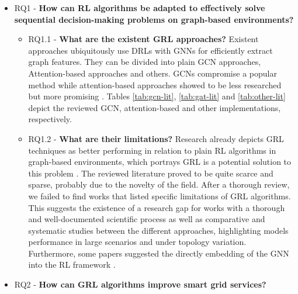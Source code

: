 \begin{itemize}
	\item RQ1 - \textbf{How can \ac{RL} algorithms be adapted to effectively solve sequential decision-making problems on graph-based environments?} 
	\begin{itemize}
		\item RQ1.1 - \textbf{What are the existent \ac{GRL} approaches?}
		 Existent approaches ubiquitously use \acp{DRL} with \acp{GNN} for efficiently extract graph features. They can be divided into plain \ac{GCN} approaches, Attention-based approaches and others. \acp{GCN} compromise a popular method while attention-based approaches showed to be less researched but more promising \cite{xingRealtimeOptimalScheduling2023, zhaoLearningSequentialDistribution2022}. Tables \ref{tab:gcn-lit}, \ref{tab:gat-lit} and \ref{tab:other-lit} depict the reviewed \ac{GCN}, attention-based and other implementations, respectively. \\
		\item RQ1.2 - \textbf{What are their limitations?}
		 Research already depicts \ac{GRL} techniques as better performing in relation to plain \ac{RL} algorithms in graph-based environments, which portrays \ac{GRL} is a potential solution to this problem \cite{chenScalableGraphReinforcement2023, liNovelGraphReinforcement2022, zhaoGraphbasedDeepReinforcement2022, xingBilevelGraphReinforcement2023, xingGraphReinforcementLearningBased2023, xuSimulationConstraintGraphReinforcement2020}. The reviewed literature proved to be quite scarce and sparse, probably due to the novelty of the field. After a thorough review, we failed to find works that listed specific limitations of \ac{GRL} algorithms. This suggests the existence of a research gap for works with a thorough and well-documented scientific process as well as comparative and systematic studies between the different approaches, highlighting models performance in large scenarios and under topology variation. Furthermore, some papers suggested the directly embedding of the \ac{GNN} into the \ac{RL} framework \cite{xingRealtimeOptimalScheduling2023, xingBilevelGraphReinforcement2023}. \\
	\end{itemize}
	\item RQ2 - \textbf{How can \ac{GRL} algorithms improve smart grid services?}
	\begin{itemize}

\end{itemize}
\end{itemize}
